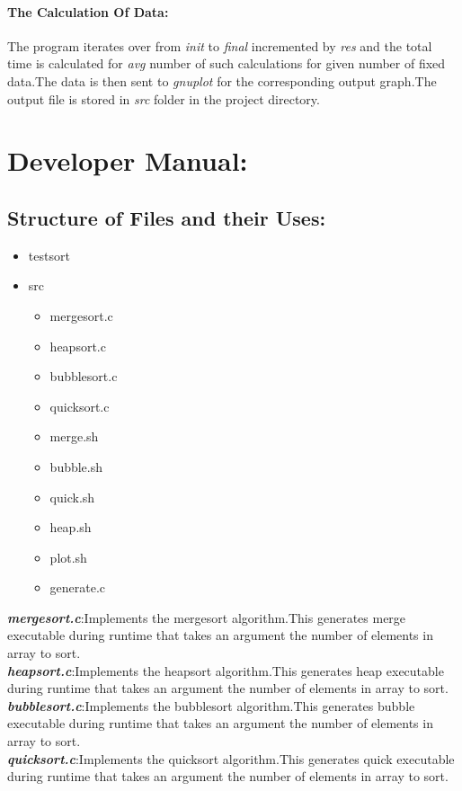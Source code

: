 \documentclass[a4paper,11pt]{article}
\begin{document}
\paragraph{The Calculation Of Data:}The program iterates over from \emph{init} to \emph{final} incremented by \emph{res} and the total time is calculated for \emph{avg} number of such calculations for given number of fixed data.The data is then sent to  \emph{gnuplot} for the corresponding output graph.The output file is stored in \emph{src} folder in the project directory.
\section{Developer Manual:}
\subsection{Structure of Files and their Uses:}
\begin{itemize}
\item testsort
\item src
\begin{itemize}
\item mergesort.c
\item heapsort.c
\item bubblesort.c
\item quicksort.c
\item merge.sh
\item bubble.sh
\item quick.sh
\item heap.sh
\item plot.sh
\item generate.c
\end{itemize}
\end{itemize}
\textbf{\emph{mergesort.c}}:Implements the mergesort algorithm.This generates merge executable during runtime that takes an argument the number of elements in array to sort.\\
\textbf{\emph{heapsort.c}}:Implements the heapsort algorithm.This generates heap executable during runtime that takes an argument the number of elements in array to sort.\\
\textbf{\emph{bubblesort.c}}:Implements the bubblesort algorithm.This generates bubble executable during runtime that takes an argument the number of elements in array to sort.\\
\textbf{\emph{quicksort.c}}:Implements the quicksort algorithm.This generates quick executable during runtime that takes an argument the number of elements in array to sort.\\
\end{document}
